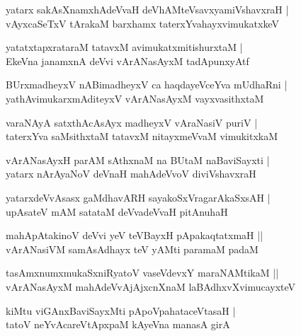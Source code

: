 \documentclass[twoside,12pt,openright]{book}
\newcounter{shloka}[chapter]
\begin{document}
\begin{shloka}
yatarx sakAsXnamxhAdeVvaH deVhAMteVsavxyamiVshavxraH |\\
vAyxcaSeTxV tArakaM barxhamx taterxYvahayxvimukatxkeV 
\end{shloka}

\begin{shloka}
yatatxtapxrataraM tatavxM avimukatxmitishurxtaM |\\
EkeVna janamxnA deVvi vArANasAyxM tadApunxyAtf 
\end{shloka}

\begin{shloka}
BUrxmadheyxV nABimadheyxV ca haqdayeVceYva mUdhaRni |\\
yathAvimukarxmAditeyxV vArANasAyxM vayxvasithxtaM 
\end{shloka}

\begin{shloka}
varaNAyA satxthAcAsAyx madheyxV vAraNasiV puriV |\\
taterxYva saMsithxtaM tatavxM nitayxmeVvaM vimukitxkaM 
\end{shloka}

\begin{shloka}
vArANasAyxH parAM sAthxnaM na BUtaM naBaviSayxti |\\
yatarx nArAyaNoV deVnaH mahAdeVvoV diviVshavxraH 
\end{shloka}

\begin{shloka}
yatarxdeVvAsasx gaMdhavARH sayakoSxVragarAkaSxsAH |\\
upAsateV mAM satataM deVvadeVvaH pitAnuhaH 
\end{shloka}

\begin{shloka}
mahApAtakinoV deVvi yeV teVBayxH pApakaqtatxmaH ||\\
vArANasiVM samAsAdhayx teV yAMti paramaM padaM 
\end{shloka}

\begin{shloka}
tasAmxnumxmukaSxniRyatoV vaseVdevxY maraNAMtikaM ||\\
vArANasAyxM mahAdeVvAjAjxcnXnaM laBAdhxvXvimucayxteV 
\end{shloka}

\begin{shloka}
kiMtu viGAnxBaviSayxMti pApoVpahataceVtasaH |\\
tatoV neYvAcareVtApxpaM kAyeVna manasA girA
\end{shloka}
\end{document}
